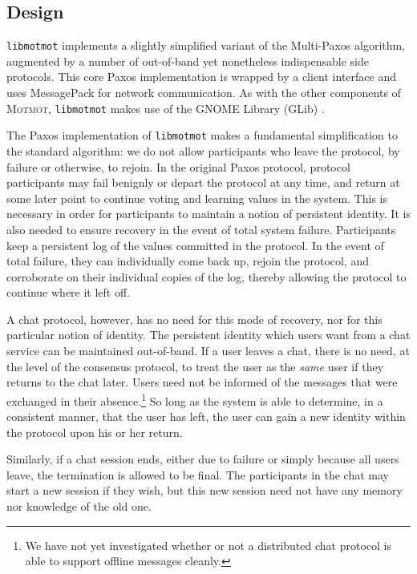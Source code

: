 \documentclass{sig-alternate}
\newcommand\Motmot{\textsc{Motmot}\xspace}
\newcommand\libmotmot{\texttt{libmotmot}\xspace}
\begin{document}
\subsection{Design}

\libmotmot implements a slightly simplified variant of the Multi-Paxos
algorithm, augmented by a number of out-of-band yet nonetheless indispensable
side protocols.  This core Paxos implementation is wrapped by a client
interface and uses MessagePack \cite{msgpack} for network communication.
As with the other components of \Motmot, \libmotmot makes use of the GNOME
Library (GLib) \cite{glib}.

The Paxos implementation of \libmotmot makes a fundamental simplification to
the standard algorithm: we do not allow participants who leave the protocol, by
failure or otherwise, to rejoin.  In the original Paxos protocol, protocol
participants may fail benignly or depart the protocol at any time, and return
at some later point to continue voting and learning values in the system.
This is necessary in order for participants to maintain a notion of persistent
identity.  It is also needed to ensure recovery in the event of total system
failure.  Participants keep a persistent log of the values committed in the
protocol.  In the event of total failure, they can individually come back up,
rejoin the protocol, and corroborate on their individual copies of the log,
thereby allowing the protocol to continue where it left off.

A chat protocol, however, has no need for this mode of recovery, nor for this
particular notion of identity.  The persistent identity which users want from
a chat service can be maintained out-of-band.  If a user leaves a chat, there
is no need, at the level of the consensus protocol, to treat the user as the
\emph{same} user if they returns to the chat later.  Users need not be informed
of the messages that were exchanged in their absence.\footnote{We have not yet
investigated whether or not a distributed chat protocol is able to support
offline messages cleanly.}  So long as the system is able to determine, in a
consistent manner, that the user has left, the user can gain a new identity
within the protocol upon his or her return.

Similarly, if a chat session ends, either due to failure or simply because all
users leave, the termination is allowed to be final.  The participants in the
chat may start a new session if they wish, but this new session need not have
any memory nor knowledge of the old one.
\end{document}
